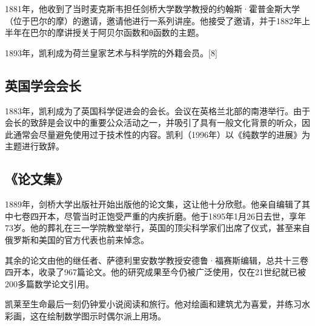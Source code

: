 1881年，他收到了当时麦克斯韦担任剑桥大学数学教授的约翰斯·霍普金斯大学（位于巴尔的摩）的邀请，邀请他进行一系列讲座。他接受了邀请，并于1882年上半年在巴尔的摩讲授关于阿贝尔函数和θ函数的主题。

1893年，凯利成为荷兰皇家艺术与科学院的外籍会员。[8]
\subsection{英国学会会长}  
1883年，凯利成为了英国科学促进会的会长。会议在英格兰北部的南港举行。由于会长的致辞是会议中的重要公众活动之一，并吸引了具有一般文化背景的听众，因此通常会尽量避免使用过于技术性的内容。凯利（1996年）以《纯数学的进展》为主题进行致辞。
\subsection{《论文集》}  
1889年，剑桥大学出版社开始出版他的论文集，这让他十分欣慰。他亲自编辑了其中七卷四开本，尽管当时正饱受严重的内疾折磨。他于1895年1月26日去世，享年73岁。他的葬礼在三一学院教堂举行，英国的顶尖科学家们出席了仪式，甚至来自俄罗斯和美国的官方代表也前来悼念。  

其余的论文由他的继任者、萨德利里安数学教授安德鲁·福赛斯编辑，总共十三卷四开本，收录了967篇论文。他的研究成果至今仍被广泛使用，仅在21世纪就已被200多篇数学论文引用。  

凯莱至生命最后一刻仍钟爱小说阅读和旅行。他对绘画和建筑尤为喜爱，并练习水彩画，这在绘制数学图示时偶尔派上用场。